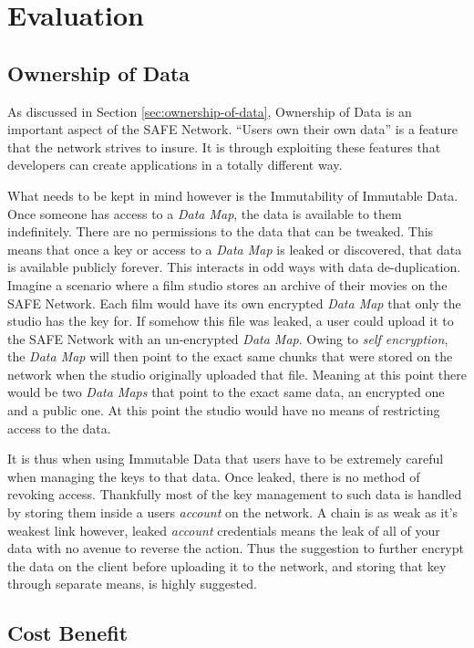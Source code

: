 \chapter{Evaluation}

\section{Ownership of Data}

As discussed in Section \ref{sec:ownership-of-data}, Ownership of Data is an important aspect of the SAFE Network. ``Users own their own data'' is a feature that the network strives to insure. It is through exploiting these features that developers can create applications in a totally different way.

What needs to be kept in mind however is the Immutability of Immutable Data. Once someone has access to a \textit{Data Map}, the data is available to them indefinitely. There are no permissions to the data that can be tweaked. This means that once a key or access to a \textit{Data Map} is leaked or discovered, that data is available publicly forever. This interacts in odd ways with data de-duplication. Imagine a scenario where a film studio stores an archive of their movies on the SAFE Network. Each film would have its own encrypted \textit{Data Map} that only the studio has the key for. If somehow this file was leaked, a user could upload it to the SAFE Network with an un-encrypted \textit{Data Map}. Owing to \textit{self encryption}, the \textit{Data Map} will then point to the exact same chunks that were stored on the network when the studio originally uploaded that file. Meaning at this point there would be two \textit{Data Maps} that point to the exact same data, an encrypted one and a public one. At this point the studio would have no means of restricting access to the data.

It is thus when using Immutable Data that users have to be extremely careful when managing the keys to that data. Once leaked, there is no method of revoking access. Thankfully most of the key management to such data is handled by storing them inside a users \textit{account} on the network. A chain is as weak as it's weakest link however, leaked \textit{account} credentials means the leak of all of your data with no avenue to reverse the action. Thus the suggestion to further encrypt the data on the client before uploading it to the network, and storing that key through separate means, is highly suggested.

\section{Cost Benefit}
 
